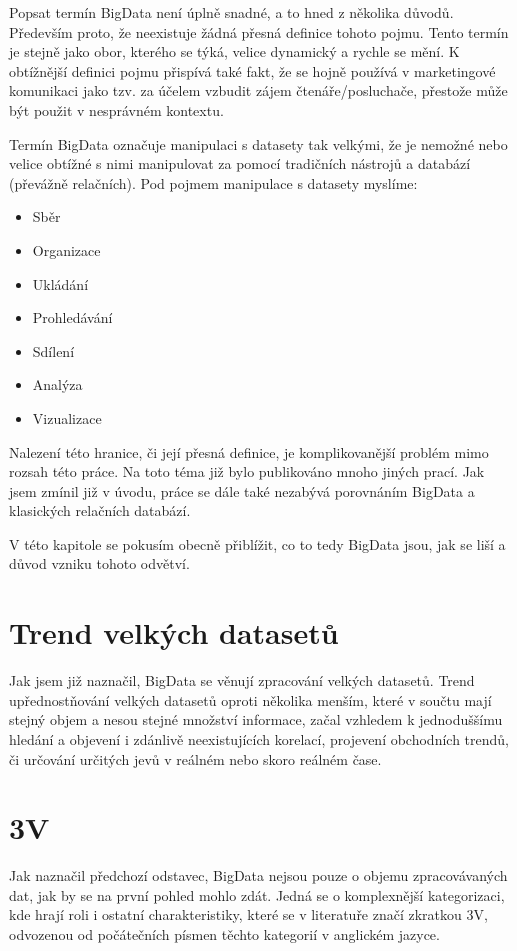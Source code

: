 

Popsat termín BigData není úplně snadné, a to hned z několika důvodů. Především proto, že neexistuje žádná přesná definice tohoto pojmu. Tento termín je stejně jako obor, kterého se týká, velice dynamický a rychle se mění. K obtížnější definici pojmu přispívá také fakt, že se hojně používá v marketingové komunikaci jako tzv.  za účelem vzbudit zájem čtenáře/posluchače, přestože může být použit v nesprávném kontextu.

Termín BigData označuje manipulaci s datasety tak velkými, že je nemožné nebo velice obtížné s nimi manipulovat za pomocí tradičních nástrojů a databází (převážně relačních). Pod pojmem manipulace s datasety myslíme:

\begin{itemize}
  \item Sběr
  \item Organizace
  \item Ukládání
 \item Prohledávání
 \item Sdílení
 \item Analýza
 \item Vizualizace
\end{itemize}

Nalezení této hranice, či její přesná definice, je komplikovanější problém mimo rozsah této práce. Na toto téma již bylo publikováno mnoho jiných prací. Jak jsem zmínil již v úvodu, práce se dále také nezabývá porovnáním BigData a klasických relačních databází. 

V této kapitole se pokusím obecně přiblížit, co to tedy BigData jsou, jak se liší a důvod vzniku tohoto odvětví.


\section{Trend velkých datasetů}
Jak jsem již naznačil, BigData se věnují zpracování velkých datasetů. Trend upřednostňování velkých datasetů oproti několika menším, které v součtu mají stejný objem a nesou stejné množství informace, začal vzhledem k jednoduššímu hledání a objevení i zdánlivě neexistujících korelací, projevení obchodních trendů, či určování určitých jevů v reálném nebo skoro reálném čase. %

\section{3V}
Jak naznačil předchozí odstavec, BigData nejsou pouze o objemu zpracovávaných dat, jak by se na první pohled mohlo zdát. Jedná se o komplexnější kategorizaci, kde hrají roli i ostatní charakteristiky, které se v literatuře značí zkratkou 3V, odvozenou od počátečních písmen těchto kategorií v anglickém jazyce.


